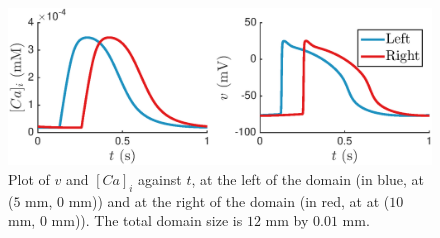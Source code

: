 \documentclass[12pt,a4paper]{article}
\begin{document}
%
\begin{figure}
   \includegraphics[width=1\linewidth]{strip} 
    \caption{Plot of $v$ and $[Ca]_i$ against $t$, at the left of the domain (in blue, at ($5$ mm, $0$ mm)) and at the right of the domain (in red, at at ($10$ mm, $0$ mm)). The total domain size is $12$ mm by $0.01$ mm.}
    \label{fig:3}
\end{figure}
%
\end{document}
